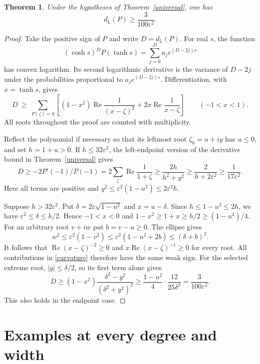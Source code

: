 \documentclass[11pt]{article}
\newtheorem{theorem}{Theorem}
\newcommand{\dd}{d_{\mathrm L}}
\begin{document}
\begin{theorem}\label{widthcost}
Under the hypotheses of Theorem~\ref{universal}, one has
\[
                          \dd(P)\ge \frac{3}{100\varepsilon^2}.
\]
\end{theorem}
\begin{proof}
Take the positive sign of $P$ and write $D=\dd(P)$. For real $s$, the function
\[
    (\cosh s)^D P(\tanh s)=\sum_{j=0}^D a_j e^{(D-2j)s}
\]
has convex logarithm. Its second logarithmic derivative is the variance of $D-2j$ under the probabilities proportional to $a_j e^{(D-2j)s}$. Differentiation, with $x=\tanh s$, gives
\begin{equation}\label{curvature}
 D\ \ge\ \sum_{P(\zeta)=0}
       \left[(1-x^2)\operatorname{Re}\frac{1}{(x-\zeta)^2}
                 +2x\operatorname{Re}\frac{1}{x-\zeta}\right]
       \qquad (-1<x<1).
\end{equation}
All roots throughout the proof are counted with multiplicity.

Reflect the polynomial if necessary so that its leftmost root $\zeta_0=u+iy$ has $u\le0$, and set $h=1+u>0$. If $h\le32\varepsilon^2$, the left-endpoint version of the derivative bound in Theorem~\ref{universal} gives
\[
 D\ge-2P'(-1)/P(-1)=2\sum_\zeta\operatorname{Re}\frac{1}{1+\zeta}
   \ge\frac{2h}{h^2+y^2}\ge\frac{2}{h+2\varepsilon^2}
   \ge\frac{1}{17\varepsilon^2}.
\]
Here all terms are positive and $y^2\le\varepsilon^2(1-u^2)\le2\varepsilon^2 h$.

Suppose $h>32\varepsilon^2$. Put $\delta=2\varepsilon\sqrt{1-u^2}$ and $x=u-\delta$. Since $h\le1-u^2\le2h$, we have $\varepsilon^2\le\delta\le h/2$. Hence $-1<x<0$ and
$1-x^2\ge1+x\ge h/2\ge(1-u^2)/4$. For an arbitrary root $v+iw$ put $b=v-u\ge0$. The ellipse gives
\[
 w^2\le\varepsilon^2(1-v^2)
     \le\varepsilon^2(1-u^2+2b)\le(\delta+b)^2 .
\]
It follows that $\operatorname{Re}(x-\zeta)^{-2}\ge0$ and $x\operatorname{Re}(x-\zeta)^{-1}\ge0$ for every root. All contributions in \eqref{curvature} therefore have the same weak sign. For the selected extreme root, $|y|\le\delta/2$, so its first term alone gives
\[
 D\ge (1-x^2)\frac{\delta^2-y^2}{(\delta^2+y^2)^2}
       \ge \frac{1-u^2}{4}\cdot\frac{12}{25\delta^2}
       =\frac{3}{100\varepsilon^2}.
\]
This also holds in the endpoint case.
\end{proof}
\section{Examples at every degree and width}
\end{document}
